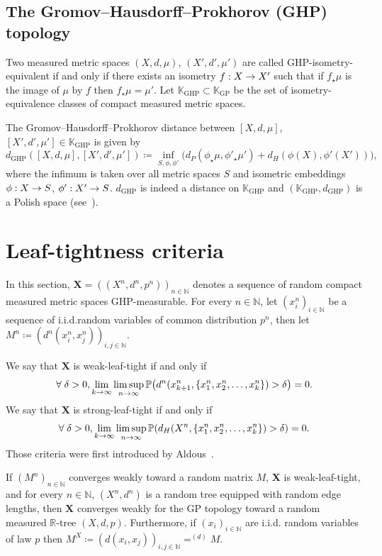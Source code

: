 \documentclass[10pt]{amsart}
\theoremstyle{definition}\newtheorem{defi}[theo]{Definition}\newtheorem{rema}[theo]{Remark}\newtheorem{exam}[theo]{Example}\newtheorem{exem}[theo]{Example}\newtheorem{nota}[theo]{Notation}
\newcommand{\proba}[1]{\mathbb{P}\left(#1\right)}
\DeclareMathOperator{\GP}{GP}
\DeclareMathOperator{\GHP}{GHP}
\newcommand{\K}{\mathbb{K}}
\newcommand{\N}{\mathbb{N}}
\newcommand{\R}{\mathbb{R}}
\newcommand{\1}{\mathbbm{1}}
\newcommand{\bfX}{\mathbf{X}}
\let\originalleft\left
\let\originalright\right
\renewcommand{\left}{\mathopen{}\mathclose\bgroup\originalleft}
\renewcommand{\right}{\aftergroup\egroup\originalright}
\renewcommand*{\to}{\mathchoice{\longrightarrow}{\rightarrow}{\rightarrow}{\rightarrow}}
\let\oldforall\forall
\renewcommand*{\forall}{\mathrel{\oldforall}}
\begin{document}
\subsection{The Gromov--Hausdorff--Prokhorov (GHP) topology}

Two measured metric spaces $(X,d,\mu)$, $(X',d',\mu')$ are called GHP-isometry-equiva\-lent if and only if there exists an isometry $f:X\to X'$ such that if $f_\star \mu$ is the image of $\mu$ by $f$ then $f_\star \mu=\mu'$. Let $\K_{\GHP}\subset\K_{\GP}$ be the set of isometry-equivalence classes of compact measured metric spaces.

The Gromov--Hausdorff--Prokhorov distance between $[X,d,\mu]$,$[X',d',\mu']\in \K_{\GHP}$ is given by
\[
d_{\GHP}([X,d,\mu],[X',d',\mu'])\coloneqq\inf_{S,\phi,\phi'} 
\bigl(d_P(\phi_\star \mu, \phi'_\star\mu')+d_H(\phi(X), \phi'(X')) \bigr),
\]
where the infimum is taken over all metric spaces $S$ and isometric embeddings $\phi :X\to S$, $\phi' :X'\to S$. $d_{\GHP}$ is indeed a distance on $\K_{\GHP}$ and $(\K_{\GHP},d_{\GHP})$ is a Polish space (see~\cite{ADH13}).
\section{Leaf-tightness criteria}\label{sec:leaf}
In this section, $\bfX=((X^n,d^n,p^n))_{n\in \N}$ denotes a sequence of random compact measured metric spaces GHP-measurable. For every $n\in \N$, let $(x_i^n)_{i\in \N}$ be a sequence of i.i.d.\@ random variables of common distribution $p^n$, then let $M^n\coloneqq(d^n(x_i^n,x_j^n))_{i,j\in \N}$.

We say that $\bfX$ is weak-leaf-tight if and only if
\begin{equation}\label{eq:weak-leaf-tight}
\forall \delta>0, \lim_{k\to \infty} \limsup_{n\to \infty} \proba{d^n(x^{n}_{k+1},\{x^n_1,x^n_2,\dots,x^n_k\})>\delta} = 0. 
\end{equation}
We say that $\bfX$ is strong-leaf-tight if and only if
\begin{equation}\label{eq:strong-leaf-tight}
\forall \delta>0, \lim_{k\to \infty} \limsup_{n\to \infty} \proba{d_H(X^n,\{x^n_1,x^n_2,\dots,x^n_k\})>\delta } = 0. 
\end{equation}
Those criteria were first introduced by Aldous~\cite{Ald91,Ald93}.

\begin{prop}\label{B.1}
If $(M^n)_{n\in \N}$ converges weakly toward a random matrix $M$, $\bfX$ is weak-leaf-tight, and for every $n\in \N$, $(X^n,d^n)$ is a random tree equipped with random edge lengths, then $\bfX$ converges weakly for the GP topology toward a random measured $\R$-tree $(X,d,p)$. Furthermore, if $(x_i)_{i\in \N}$ are i.i.d. random variables of law $p$ then $M^X\coloneqq(d(x_i,x_j))_{i,j\in \N}=^{(d)} M$.
\end{prop}
\end{document}
